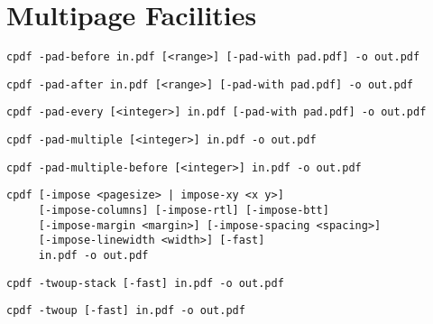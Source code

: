 \documentclass{book}
\begin{document}
\chapter{Multipage Facilities}\pagestyle{fancy}\label{multipage}\label{chap:9}
  \begin{framed}
    \small\noindent\verb!cpdf -pad-before in.pdf [<range>] [-pad-with pad.pdf] -o out.pdf!

    \vspace{1.5mm}
    \small\noindent\verb!cpdf -pad-after in.pdf [<range>] [-pad-with pad.pdf] -o out.pdf!

    \vspace{1.5mm}
    \small\noindent\verb!cpdf -pad-every [<integer>] in.pdf [-pad-with pad.pdf] -o out.pdf!

    \vspace{1.5mm}
    \small\noindent\verb!cpdf -pad-multiple [<integer>] in.pdf -o out.pdf!

    \vspace{1.5mm}
    \small\noindent\verb!cpdf -pad-multiple-before [<integer>] in.pdf -o out.pdf!

    \vspace{1.5mm}
    \small\noindent\verb!cpdf [-impose <pagesize> | impose-xy <x y>]!\\
    \small\noindent\verb!     [-impose-columns] [-impose-rtl] [-impose-btt]!\\
    \small\noindent\verb!     [-impose-margin <margin>] [-impose-spacing <spacing>]!\\
    \small\noindent\verb!     [-impose-linewidth <width>] [-fast]!\\
    \small\noindent\verb!     in.pdf -o out.pdf!

    \vspace{1.5mm}
    \small\noindent\verb!cpdf -twoup-stack [-fast] in.pdf -o out.pdf! 

    \vspace{1.5mm}
    \small\noindent\verb!cpdf -twoup [-fast] in.pdf -o out.pdf! 

  \end{framed}
\end{document}
